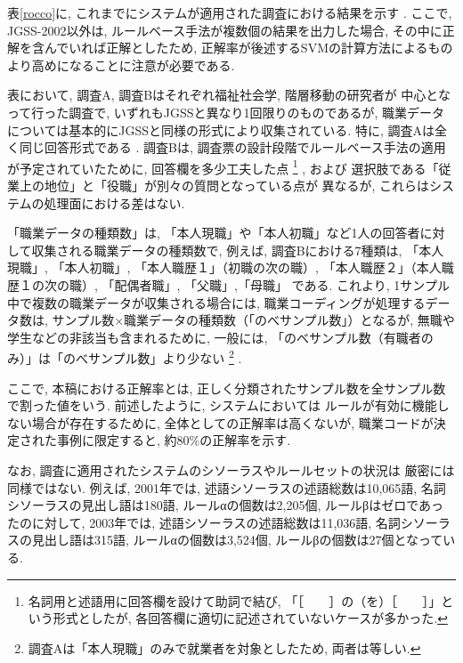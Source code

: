 \documentclass{nlp}
\begin{document}
表\ref{rocco}に, これまでにシステムが適用された調査における結果を示す 
\cite{Takahashi01,Takahashi02a,Takahashi02b,Takahashi03,Takahashi04}
. 
ここで, JGSS-2002以外は, ルールベース手法が複数個の結果を出力した場合, 
その中に正解を含んでいれば正解としたため, 
正解率が後述するSVMの計算方法によるものより高めになることに注意が必要である. 

表において, 
調査A, 調査Bはそれぞれ福祉社会学, 階層移動の研究者が
中心となって行った調査で, 
いずれもJGSSと異なり1回限りのものであるが, 
職業データについては基本的にJGSSと同様の形式により収集されている. 
特に, 
調査Aは全く同じ回答形式である
\cite{Takahashi01}
. 
調査Bは, 
調査票の設計段階でルールベース手法の適用が予定されていたために, 
回答欄を多少工夫した点
\footnote{名詞用と述語用に回答欄を設けて助詞で結び, 
「［　　］の（を）［　　］」という形式としたが, 
各回答欄に適切に記述されていないケースが多かった. }
, および
選択肢である「従業上の地位」と「役職」が別々の質問となっている点が
異なるが, 
これらはシステムの処理面における差はない. 

「職業データの種類数」は, 
「本人現職」や「本人初職」など1人の回答者に対して収集される職業データの種類数で, 
例えば, 調査Bにおける7種類は, 
「本人現職」, 「本人初職」, 「本人職歴１」（初職の次の職）, 
「本人職歴２」（本人職歴１の次の職）, 「配偶者職」, 「父職」,「母職」
である. 
これより, 
1サンプル中で複数の職業データが収集される場合には, 
職業コーディングが処理するデータ数は, 
サンプル数×職業データの種類数（「のべサンプル数」）となるが, 
無職や学生などの非該当も含まれるために, 
一般には, 「のべサンプル数（有職者のみ）」は「のべサンプル数」より少ない
\footnote{調査Aは「本人現職」のみで就業者を対象としたため, 両者は等しい. }
. 

ここで, 本稿における正解率とは, 
正しく分類されたサンプル数を全サンプル数で割った値をいう. 
前述したように, システムにおいては
ルールが有効に機能しない場合が存在するために, 
全体としての正解率は高くないが, 
職業コードが決定された事例に限定すると, 約80$\%$の正解率を示す. 

なお, 
調査に適用されたシステムのシソーラスやルールセットの状況は
厳密には同様ではない. 
例えば, 2001年では, 
述語シソーラスの述語総数は10,065語, 
名詞シソーラスの見出し語は180語, 
ルールαの個数は2,205個, ルールβはゼロであったのに対して, 
2003年では, 
述語シソーラスの述語総数は11,036語, 
名詞シソーラスの見出し語は315語, 
ルールαの個数は3,524個, ルールβの個数は27個となっている. 
\end{document}
